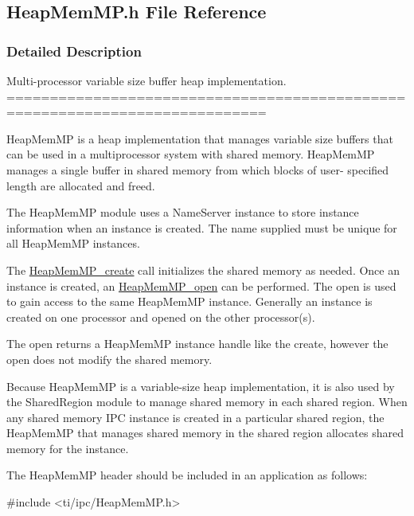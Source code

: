 \subsection{Heap\-Mem\-M\-P.\-h File Reference}
\label{_heap_mem_m_p_8h}


\subsubsection{Detailed Description}
Multi-\/processor variable size buffer heap implementation. ============================================================================

Heap\-Mem\-M\-P is a heap implementation that manages variable size buffers that can be used in a multiprocessor system with shared memory. Heap\-Mem\-M\-P manages a single buffer in shared memory from which blocks of user-\/ specified length are allocated and freed.

The Heap\-Mem\-M\-P module uses a Name\-Server instance to store instance information when an instance is created. The name supplied must be unique for all Heap\-Mem\-M\-P instances.

The \hyperlink{_heap_mem_m_p_8h_a3ee79b7e84e8eaef048c919be45e0a7c}{Heap\-Mem\-M\-P\-\_\-create} call initializes the shared memory as needed. Once an instance is created, an \hyperlink{_heap_mem_m_p_8h_a05598b30cd1a93e88e59cea962d1e976}{Heap\-Mem\-M\-P\-\_\-open} can be performed. The open is used to gain access to the same Heap\-Mem\-M\-P instance. Generally an instance is created on one processor and opened on the other processor(s).

The open returns a Heap\-Mem\-M\-P instance handle like the create, however the open does not modify the shared memory.

Because Heap\-Mem\-M\-P is a variable-\/size heap implementation, it is also used by the Shared\-Region module to manage shared memory in each shared region. When any shared memory I\-P\-C instance is created in a particular shared region, the Heap\-Mem\-M\-P that manages shared memory in the shared region allocates shared memory for the instance.

The Heap\-Mem\-M\-P header should be included in an application as follows\-: 
\begin{DoxyCode}
\textcolor{preprocessor}{    #include <ti/ipc/HeapMemMP.h>}
\end{DoxyCode}


